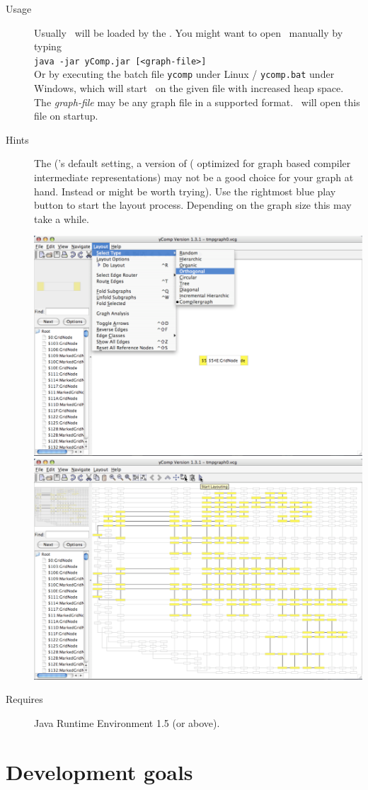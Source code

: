 \begin{description}
  \item[Usage] Usually \yComp\ will be loaded by the \GrShell. You might want to open \yComp\ manually by typing\\
   \texttt{java -jar yComp.jar [<graph-file>]}\\
  Or by executing the batch file \texttt{ycomp} under Linux / \texttt{ycomp.bat} under Windows, 
  which will start \yComp\ on the given file with increased heap space. 
  The \emph{graph-file} may be any graph file in a supported format. \yComp\ will open this file on startup.
  \item[Hints] The   (\yComp's default setting, a version of (\texttt{} optimized for graph based compiler intermediate representations) may not be a good choice for your graph at hand. 
  Instead \texttt{} or \texttt{} might be worth trying). 
  Use the rightmost blue play button to start the layout process. Depending on the graph size this may take a while.
\begin{center}
\includegraphics[width=0.45\linewidth]{fig/ycomp1.pdf} \includegraphics[width=0.45\linewidth]{fig/ycomp2.pdf}
\end{center}
  \item[Requires] Java Runtime Environment 1.5 (or above).
\end{description}


\section{Development goals}


